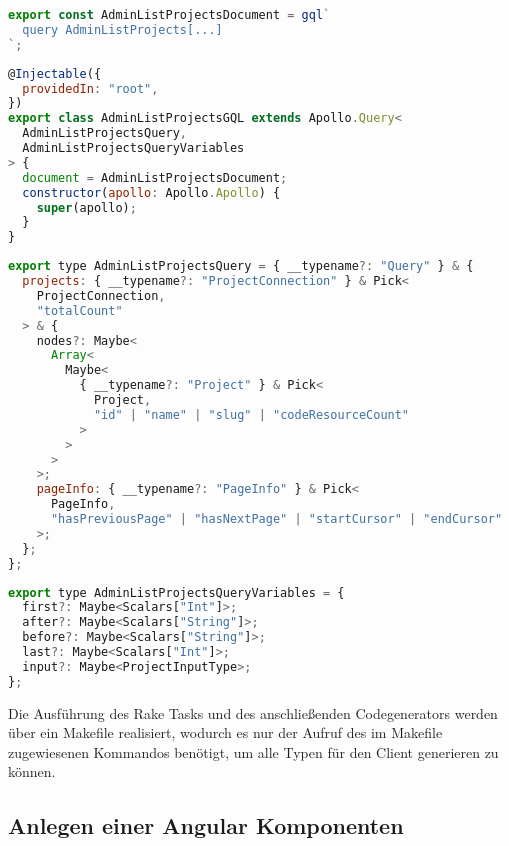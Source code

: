 \begin{lstlisting}[language=JavaScript,float=h!,caption={Generierter Aufruf der gql-Funktion erhält die AdminListProjects Query als String}, label={lst:graphql:gen-gql}]
export const AdminListProjectsDocument = gql`
  query AdminListProjects[...]
`;
\end{lstlisting}

\begin{lstlisting}[language=JavaScript,float=h!,caption={Generierter Service enthält den Aufruf der Query als Instanzvariable}, label={lst:graphql:gen-service}]
@Injectable({
  providedIn: "root",
})
export class AdminListProjectsGQL extends Apollo.Query<
  AdminListProjectsQuery,
  AdminListProjectsQueryVariables
> {
  document = AdminListProjectsDocument;
  constructor(apollo: Apollo.Apollo) {
    super(apollo);
  }
}
\end{lstlisting}

\begin{lstlisting}[language=JavaScript,float=h!,caption={Generierter Antworttyp}, label={lst:graphql:gen-responsetype}]
export type AdminListProjectsQuery = { __typename?: "Query" } & {
  projects: { __typename?: "ProjectConnection" } & Pick<
    ProjectConnection,
    "totalCount"
  > & {
    nodes?: Maybe<
      Array<
        Maybe<
          { __typename?: "Project" } & Pick<
            Project,
            "id" | "name" | "slug" | "codeResourceCount"
          >
        >
      >
    >;
    pageInfo: { __typename?: "PageInfo" } & Pick<
      PageInfo,
      "hasPreviousPage" | "hasNextPage" | "startCursor" | "endCursor"
    >;
  };
};
\end{lstlisting}
\begin{lstlisting}[language=JavaScript,float=h!,caption={Generierter Parametertyp}, label={lst:graphql:gen-variables}]
export type AdminListProjectsQueryVariables = {
  first?: Maybe<Scalars["Int"]>;
  after?: Maybe<Scalars["String"]>;
  before?: Maybe<Scalars["String"]>;
  last?: Maybe<Scalars["Int"]>;
  input?: Maybe<ProjectInputType>;
};
\end{lstlisting}


Die Ausführung des Rake Tasks und des anschließenden Codegenerators werden über ein Makefile realisiert, wodurch es nur der Aufruf des im Makefile zugewiesenen Kommandos benötigt, um alle Typen für den Client generieren zu können. 

\subsection{Anlegen einer Angular Komponenten}
\label{impl:graphql:component}

